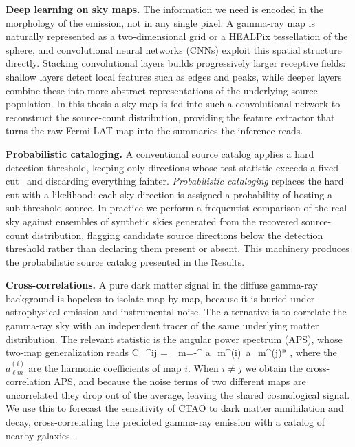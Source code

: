 \textbf{Deep learning on sky maps.} The information we need is encoded in the morphology of the emission, not in any single pixel. A gamma-ray map is naturally represented as a two-dimensional grid or a HEALPix tessellation of the sphere, and convolutional neural networks (CNNs) exploit this spatial structure directly. Stacking convolutional layers builds progressively larger receptive fields: shallow layers detect local features such as edges and peaks, while deeper layers combine these into more abstract representations of the underlying source population. In this thesis a sky map is fed into such a convolutional network to reconstruct the source-count distribution, providing the feature extractor that turns the raw Fermi-LAT map into the summaries the inference reads.

\textbf{Probabilistic cataloging.} A conventional source catalog applies a hard detection threshold, keeping only directions whose test statistic exceeds a fixed cut~\cite{Mattox:1996zz} and discarding everything fainter. \emph{Probabilistic cataloging} replaces the hard cut with a likelihood: each sky direction is assigned a probability of hosting a sub-threshold source. In practice we perform a frequentist comparison of the real sky against ensembles of synthetic skies generated from the recovered source-count distribution, flagging candidate source directions below the detection threshold rather than declaring them present or absent. This machinery produces the probabilistic source catalog presented in the Results.

\textbf{Cross-correlations.} A pure dark matter signal in the diffuse gamma-ray background is hopeless to isolate map by map, because it is buried under astrophysical emission and instrumental noise. The alternative is to correlate the gamma-ray sky with an independent tracer of the same underlying matter distribution. The relevant statistic is the angular power spectrum (APS), whose two-map generalization reads
\be
C_\ell^{ij} =  \left\langle \sum_{m=-\ell}^{\ell} a_{\ell m}^{(i)}\, a_{\ell m}^{(j)*} \right\rangle,
\ee
where the $a_{\ell m}^{(i)}$ are the harmonic coefficients of map $i$. When $i \neq j$ we obtain the cross-correlation APS, and because the noise terms of two different maps are uncorrelated they drop out of the average, leaving the shared cosmological signal. We use this to forecast the sensitivity of CTAO to dark matter annihilation and decay, cross-correlating the predicted gamma-ray emission with a catalog of nearby galaxies~\cite{Camera:2012cj}.

